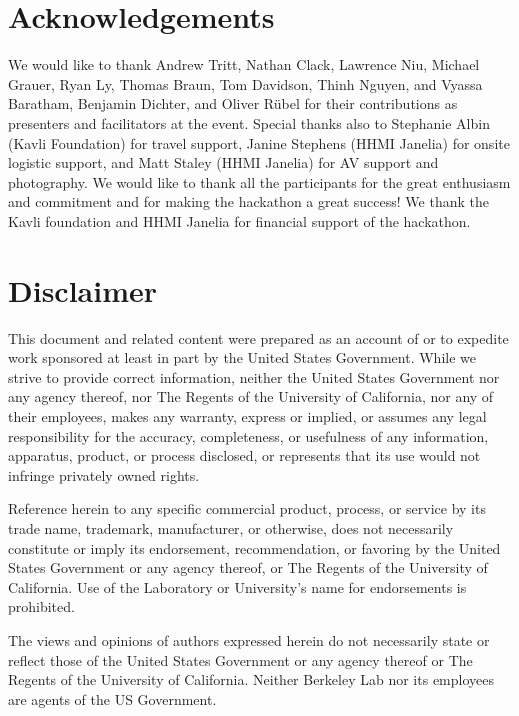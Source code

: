 \documentclass{article}
\begin{document}
\clearpage
\section*{Acknowledgements}
\label{sec:ack}

We would like to thank Andrew Tritt, Nathan Clack, Lawrence Niu,
Michael Grauer, Ryan Ly, Thomas Braun, Tom Davidson,
Thinh Nguyen, and Vyassa Baratham, Benjamin Dichter, and Oliver R\"ubel 
for their contributions as presenters and facilitators at the event. 
Special thanks also to  Stephanie Albin (Kavli Foundation) 
for travel support, Janine Stephens (HHMI Janelia) for onsite
logistic support, and Matt Staley (HHMI Janelia) for AV support
and photography. We would like to thank all the participants 
for the great enthusiasm and commitment and for making the 
hackathon a great success! We thank the Kavli foundation and
HHMI Janelia for financial support of the hackathon. 


\section*{Disclaimer}
\label{sec:disc}


This document and related content were prepared as an account of or to expedite 
work sponsored at least in part by the United States Government. While we strive
to provide correct information, neither the United States Government nor any 
agency thereof, nor The Regents of the University of California, nor any of their 
employees, makes any warranty, express or implied, or assumes any legal responsibility
for the accuracy, completeness, or usefulness of any information, apparatus, product,
or process disclosed, or represents that its use would not infringe privately owned rights.

Reference herein to any specific commercial product, process, or service by its 
trade name, trademark, manufacturer, or otherwise, does not necessarily constitute
or imply its endorsement, recommendation, or favoring by the United States Government
or any agency thereof, or The Regents of the University of California. Use of the 
Laboratory or University’s name for endorsements is prohibited.

The views and opinions of authors expressed herein do not necessarily state or reflect 
those of the United States Government or any agency thereof or The Regents of the 
University of California. Neither Berkeley Lab nor its employees are agents of the US Government.
\end{document}
